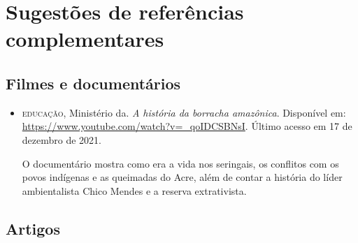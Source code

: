 \documentclass[11pt]{extarticle}
\begin{document}
\section{Sugestões de referências complementares}

\subsection{Filmes e documentários} 
\begin{itemize}

\item \textsc{educação}, Ministério da. \textit{A história da borracha amazônica}. Disponível em: \url{https://www.youtube.com/watch?v=_qoIDCSBNsI}. Último acesso em 17 de dezembro de 2021.

O documentário mostra como era a vida nos seringais, os conflitos com os povos indígenas e as 
queimadas do Acre, além de contar a história do líder ambientalista Chico Mendes e a reserva extrativista.

\end{itemize}

\subsection{Artigos}
\end{document}
